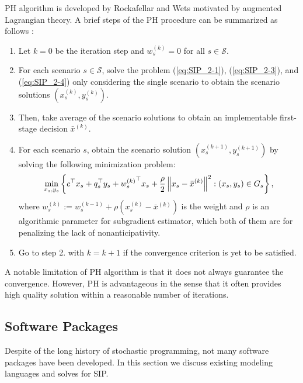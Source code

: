 PH algorithm is developed by Rockafellar and Wets \cite{journal:RW1991} motivated by augmented Lagrangian theory. 
A brief steps of the PH procedure can be summarized as follows \cite{book:pyomo}:
\begin{enumerate}
	\item Let $k=0$ be the iteration step and $w_s^{(k)}=0$ for all $s\in\mathcal{S}$.
	\item For each scenario $s\in\mathcal{S}$, solve the problem (\ref{eq:SIP_2-1}), (\ref{eq:SIP_2-3}), and (\ref{eq:SIP_2-4}) only considering the single scenario to obtain the scenario solutions $(x_s^{(k)},y_s^{(k)})$.
	\item Then, take average of the scenario solutions to obtain an implementable first-stage decision $\bar{x}^{(k)}$.
	\item For each scenario $s$, obtain the scenario solution $(x_s^{(k+1)},y_s^{(k+1)})$ by solving the following minimization problem:
	\begin{align*}
	\min_{x_s,y_s}\left\{c^\top x_s+q_s^\top y_s + {w_s^{(k)}}^\top x_s +\frac{\rho}{2}\left\lVert x_s-\bar{x}^{(k)}\right\rVert^2 : (x_s,y_s)\in G_s \right\},
	\end{align*}
	where ${w_s^{(k)}}:={w_s^{(k-1)}}+\rho(x_s^{(k)}-\bar{x}^{(k)})$ is the weight and $\rho$ is an algorithmic parameter for subgradient estimator, which both of them are for penalizing the lack of nonanticipativity.
	\item Go to step 2. with $k=k+1$ if the convergence criterion is yet to be satisfied. 
\end{enumerate}
A notable limitation of PH algorithm is that it does not always guarantee the convergence. However, PH is advantageous in the sense that it often provides high quality solution within a reasonable number of iterations. 

\subsection{Software Packages}

Despite of the long history of stochastic programming, not many software packages have been developed. In this section we discuss existing modeling languages and solves for SIP.

